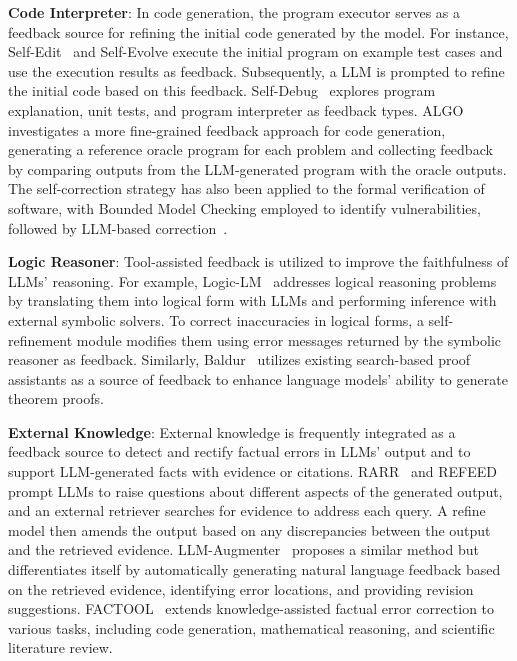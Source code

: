 \documentclass[a4paper,oneside]{book}
\begin{document}
\textbf{Code Interpreter}: In code generation, the program executor serves as a feedback source for refining the initial code generated by the model. For instance, Self-Edit~\cite{zhang2023selfedit} and Self-Evolve execute the initial program on example test cases and use the execution results as feedback. Subsequently, a LLM is prompted to refine the initial code based on this feedback. Self-Debug~\cite{chen2023teaching} explores program explanation, unit tests, and program interpreter as feedback types. ALGO~\cite{zhang2023algo} investigates a more fine-grained feedback approach for code generation, generating a reference oracle program for each problem and collecting feedback by comparing outputs from the LLM-generated program with the oracle outputs. The self-correction strategy has also been applied to the formal verification of software, with Bounded Model Checking employed to identify vulnerabilities, followed by LLM-based correction~\cite{charalambous2023new}.

\textbf{Logic Reasoner}: Tool-assisted feedback is utilized to improve the faithfulness of LLMs' reasoning. For example, Logic-LM~\cite{pan2023logiclm} addresses logical reasoning problems by translating them into logical form with LLMs and performing inference with external symbolic solvers. To correct inaccuracies in logical forms, a self-refinement module modifies them using error messages returned by the symbolic reasoner as feedback. Similarly, Baldur~\cite{first2023baldur} utilizes existing search-based proof assistants as a source of feedback to enhance language models' ability to generate theorem proofs.

\textbf{External Knowledge}: External knowledge is frequently integrated as a feedback source to detect and rectify factual errors in LLMs' output and to support LLM-generated facts with evidence or citations. RARR~\cite{gao2023rarr} and REFEED~\cite{yu2023improving} prompt LLMs to raise questions about different aspects of the generated output, and an external retriever searches for evidence to address each query. A refine model then amends the output based on any discrepancies between the output and the retrieved evidence. LLM-Augmenter~\cite{peng2023check} proposes a similar method but differentiates itself by automatically generating natural language feedback based on the retrieved evidence, identifying error locations, and providing revision suggestions. FACTOOL~\cite{chern2023factool} extends knowledge-assisted factual error correction to various tasks, including code generation, mathematical reasoning, and scientific literature review.
\end{document}
